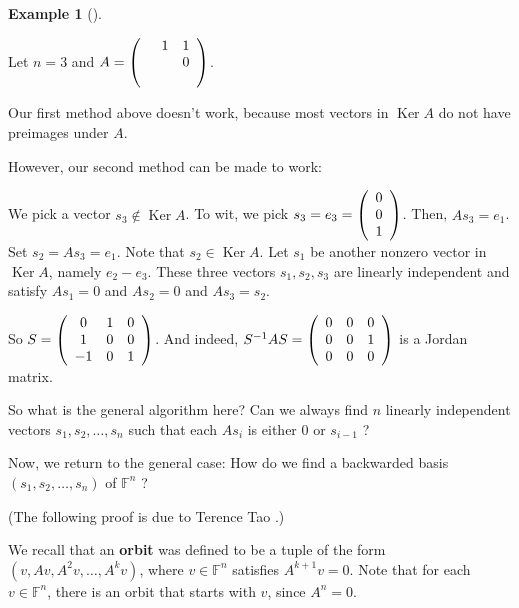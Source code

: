 \documentclass[numbers=enddot,12pt,final,onecolumn,notitlepage]{scrartcl}%
\numberwithin{exer}{subsection}
\theoremstyle{definition}
\newtheorem{exam}[theo]{Example}
\newenvironment{example}[1][]
{\begin{exam}[#1]\begin{leftbar}}
{\end{leftbar}\end{exam}}
\begin{document}
\begin{example}
Let $n=3$ and $A=\left(
\begin{array}
[c]{ccc}
& 1 & 1\\
&  & 0\\
&  &
\end{array}
\right)  $.

Our first method above doesn't work, because most vectors in
$\operatorname*{Ker}A$ do not have preimages under $A$.

However, our second method can be made to work:

We pick a vector $s_{3}\notin\operatorname*{Ker}A$. To wit, we pick
$s_{3}=e_{3}=\left(
\begin{array}
[c]{c}%
0\\
0\\
1
\end{array}
\right)  $. Then, $As_{3}=e_{1}$. Set $s_{2}=As_{3}=e_{1}$. Note that
$s_{2}\in\operatorname*{Ker}A$. Let $s_{1}$ be another nonzero vector in
$\operatorname*{Ker}A$, namely $e_{2}-e_{3}$.{} These three vectors
$s_{1},s_{2},s_{3}$ are linearly independent and satisfy $As_{1}=0$ and
$As_{2}=0$ and $As_{3}=s_{2}$.

So $S=\left(
\begin{array}
[c]{ccc}%
0 & 1 & 0\\
1 & 0 & 0\\
-1 & 0 & 1
\end{array}
\right)  $. And indeed, $S^{-1}AS=\allowbreak\left(
\begin{array}
[c]{ccc}%
0 & 0 & 0\\
0 & 0 & 1\\
0 & 0 & 0
\end{array}
\right)  $ is a Jordan matrix.
\end{example}

So what is the general algorithm here? Can we always find $n$ linearly
independent vectors $s_{1},s_{2},\ldots,s_{n}$ such that each $As_{i}$ is
either $0$ or $s_{i-1}$ ?

\bigskip

Now, we return to the general case: How do we find a backwarded basis $\left(
s_{1},s_{2},\ldots,s_{n}\right)  $ of $\mathbb{F}^{n}$ ?

(The following proof is due to Terence Tao \cite{Tao07}.)

We recall that an \textbf{orbit} was defined to be a tuple of the form
$\left(  v,Av,A^{2}v,\ldots,A^{k}v\right)  $, where $v\in\mathbb{F}^{n}$
satisfies $A^{k+1}v=0$. Note that for each $v\in\mathbb{F}^{n}$, there is an
orbit that starts with $v$, since $A^{n}=0$.
\end{document}
